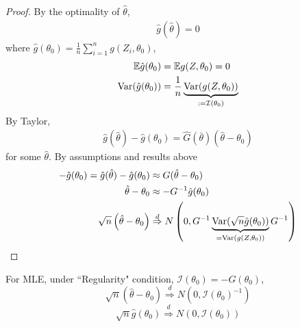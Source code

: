 \documentclass[11pt]{elegantbook}
\begin{document}
\begin{proof}
    By the optimality of $\hat{\theta}$,
    \begin{equation}
        \begin{aligned}
            \hat{g}(\hat{\theta})=0
        \end{aligned}
        \nonumber
    \end{equation}
    where $\hat{g}(\theta_0)=\frac{1}{n}\sum_{i=1}^n g(Z_i,\theta_0)$,
    \begin{equation}
        \begin{aligned}
            \mathbb{E}\hat{g}(\theta_0)&=\mathbb{E}g(Z,\theta_0)=0\\
            \textnormal{Var}(\hat{g}(\theta_0))&=\frac{1}{n}\underbrace{\textnormal{Var}(g(Z,\theta_0))}_{:=\mathcal{I}(\theta_0)}
        \end{aligned}
        \nonumber
    \end{equation}
    By Taylor,
    \begin{equation}
        \begin{aligned}
            \hat{g}(\hat{\theta})-\hat{g}(\theta_0)=\hat{G}(\bar{\theta})(\hat{\theta}-\theta_0)
        \end{aligned}
        \nonumber
    \end{equation}
    for some $\hat{\theta}$. By assumptions and results above
    \begin{equation}
        \begin{aligned}
            -\hat{g}(\theta_0)=\hat{g}(\hat{\theta})-\hat{g}(\theta_0)&\approx G(\hat{\theta}-\theta_0)\\
            \hat{\theta}-\theta_0&\approx -G^{-1}\hat{g}(\theta_0)\\
            \sqrt{n}\left(\hat{\theta}-\theta_0\right) &\stackrel{d}{\Rightarrow} N\left(0,G^{-1}\underbrace{\textnormal{Var}(\sqrt{n}\hat{g}(\theta_0))}_{=\textnormal{Var}(g(Z,\theta_0))}G^{-1}\right)
        \end{aligned}
        \nonumber
    \end{equation}
\end{proof}

\begin{corollary}\label{cor:asymptotic_normality_of_m_estimators}
    For MLE, under ``Regularity" condition, $\mathcal{I}(\theta_0)=-G(\theta_0)$, $$\sqrt{n}\left(\hat{\theta}-\theta_0\right) \stackrel{d}{\Rightarrow} N\left(0,\mathcal{I}(\theta_0)^{-1}\right)$$
    $$\sqrt{n}\hat{g}(\theta_0)\stackrel{d}{\Rightarrow} N\left(0,\mathcal{I}(\theta_0)\right)$$
\end{corollary}
\end{document}
